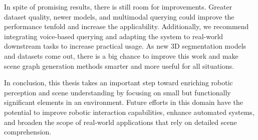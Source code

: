 In spite of promising results, there is still room for improvements. Greater dataset quality, newer models, and multimodal querying could improve the performance tenfold and increase the applicability. Additionally, we recommend integrating voice-based querying and adapting the system to real-world downstream tasks to increase practical usage. As new 3D segmentation models and datasets come out, there is a big chance to improve this work and make scene graph generation methods smarter and more useful for all situations. 

In conclusion, this thesis takes an important step toward enriching robotic perception and scene understanding by focusing on small but functionally significant elements in an environment. Future efforts in this domain have the potential to improve robotic interaction capabilities, enhance automated systems, and broaden the scope of real-world applications that rely on detailed scene comprehension.
